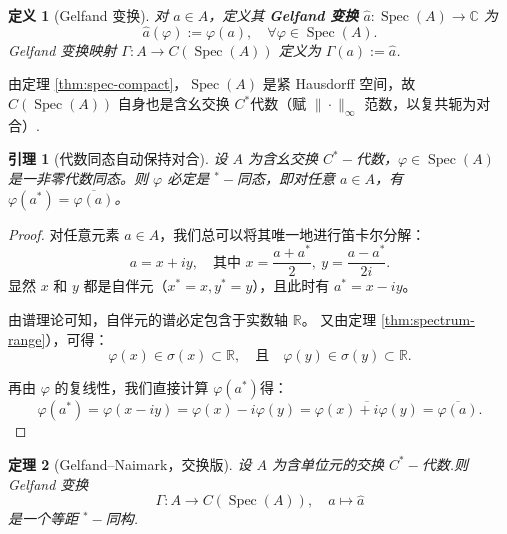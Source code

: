 \documentclass[math-font=lm, text-font=lm, math-style=TeX]{sjtureport}
\newtheorem{theorem}{定理}[chapter]
\newtheorem{lemma}[theorem]{引理}
\newtheorem{definition}{定义}[chapter]
\theoremstyle{plain}
\newtheorem*{proof}{证明}
\theoremstyle{plain}
\DeclareMathOperator{\Spec}{Spec}
\begin{document}
\begin{definition}[Gelfand 变换]
    对 $a \in A$，定义其 \textbf{Gelfand 变换} $\widehat{a}: \Spec(A) \to \mathbb{C}$ 为
    \begin{equation}
        \widehat{a}(\varphi) := \varphi(a), \quad \forall \varphi \in \Spec(A).
    \end{equation}
    Gelfand 变换映射 $\Gamma: A \to C(\Spec(A))$ 定义为 $\Gamma(a) := \widehat{a}$.
\end{definition}

由定理 \ref{thm:spec-compact}，$\Spec(A)$ 是紧 Hausdorff 空间，故 $C(\Spec(A))$ 自身也是含幺交换 $C^*$代数（赋 $\|\cdot\|_\infty$ 范数，以复共轭为对合）.
\begin{lemma}[代数同态自动保持对合]\label{lem:homo-involution}
    设 $A$ 为含幺交换 $C^*-\!$代数，$\varphi \in \Spec(A)$ 是一非零代数同态。则 $\varphi$ 必定是 ${}^*-\!$同态，即对任意 $a \in A$，有 $\varphi(a^*) = \overline{\varphi(a)}$。
\end{lemma}
\begin{proof}


    对任意元素 $a \in A$，我们总可以将其唯一地进行笛卡尔分解：
    \begin{equation*}
        a = x + i y, \quad \text{其中 } x = \frac{a+a^*}{2},\ y = \frac{a-a^*}{2i}.
    \end{equation*}
    显然 $x$ 和 $y$ 都是自伴元（$x^* = x, y^* = y$），且此时有 $a^* = x - i y$。
    
    由谱理论可知，自伴元的谱必定包含于实数轴 $\mathbb{R}$。
    又由定理 \ref{thm:spectrum-range}），可得：
    \begin{equation*}
        \varphi(x) \in \sigma(x) \subset \mathbb{R}, \quad \text{且} \quad \varphi(y) \in \sigma(y) \subset \mathbb{R}.
    \end{equation*}
    
    再由 $\varphi$ 的复线性，我们直接计算 $\varphi(a^*)$得：
    \begin{equation*}
        \varphi(a^*) = \varphi(x - i y) = \varphi(x) - i \varphi(y) = \overline{\varphi(x) + i \varphi(y)} = \overline{\varphi(a)}.
    \end{equation*}

\end{proof}

\begin{theorem}[Gelfand--Naimark，交换版]\label{thm:gn-commutative}
    设 $A$ 为含单位元的交换 $C^*-\!$代数.则 Gelfand 变换
    \begin{equation}
        \Gamma: A \longrightarrow C(\Spec(A)), \quad a \longmapsto \widehat{a}
    \end{equation}
    是一个等距 ${}^*-\!$同构.
\end{theorem}
\end{document}
